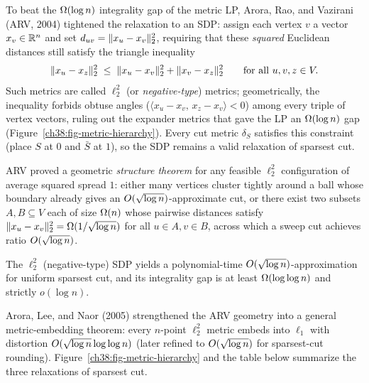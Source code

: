 \begin{intuitionbox}
To beat the $\Omega(\log n)$ integrality gap of the metric LP, Arora, Rao, and Vazirani (ARV, 2004) tightened
the relaxation to an SDP: assign each vertex $v$ a vector $x_v\in\mathbb{R}^n$ and set $d_{uv} = \lVert x_u - x_v\rVert_2^2$,
requiring that these \emph{squared} Euclidean distances still satisfy the triangle inequality
\[
  \lVert x_u - x_z\rVert_2^2 \;\le\; \lVert x_u - x_v\rVert_2^2 + \lVert x_v - x_z\rVert_2^2 \qquad\text{for all } u,v,z\in V.
\]
Such metrics are called \emph{$\ell_2^2$} (or \emph{negative-type}) metrics; geometrically, the inequality
forbids obtuse angles ($\langle x_u-x_v,\, x_z-x_v\rangle < 0$) among every triple of vertex vectors, ruling
out the expander metrics that gave the LP an $\Omega(\log n)$ gap (Figure~\ref{ch38:fig-metric-hierarchy}).
Every cut metric $\delta_S$ satisfies this constraint (place $S$ at $0$ and $\bar S$ at $1$), so the SDP remains
a valid relaxation of sparsest cut.

ARV proved a geometric \emph{structure theorem} for any feasible $\ell_2^2$ configuration of average squared
spread $1$: either many vertices cluster tightly around a ball whose boundary already gives an
$O(\sqrt{\log n})$-approximate cut, or there exist two subsets $A,B\subseteq V$ each of size $\Omega(n)$ whose
pairwise distances satisfy $\lVert x_u - x_v\rVert_2^2 = \Omega(1/\sqrt{\log n})$ for all $u\in A, v\in B$, across
which a sweep cut achieves ratio $O(\sqrt{\log n})$.
\end{intuitionbox}

\begin{theorem}\label{ch38:thm-arv}
The $\ell_2^2$ (negative-type) SDP yields a polynomial-time $O(\sqrt{\log n})$-approximation for uniform
sparsest cut, and its integrality gap is at least $\Omega(\log\log n)$ and strictly $o(\log n)$.
\end{theorem}

Arora, Lee, and Naor (2005) strengthened the ARV geometry into a general metric-embedding theorem: every
$n$-point $\ell_2^2$ metric embeds into $\ell_1$ with distortion $O(\sqrt{\log n}\log\log n)$ (later refined
to $O(\sqrt{\log n})$ for sparsest-cut rounding). Figure~\ref{ch38:fig-metric-hierarchy} and the table below
summarize the three relaxations of sparsest cut.

